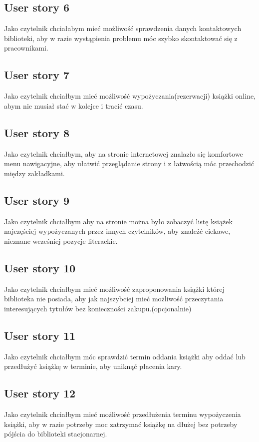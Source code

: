 \documentclass[a4paper]{article}
\begin{document}
\subsection{User story 6}
Jako czytelnik chciałabym mieć możliwość sprawdzenia danych kontaktowych biblioteki, aby w razie wystąpienia problemu móc szybko skontaktować się z pracownikami. 

\subsection{User story 7}
Jako czytelnik chciałbym mieć możliwość wypożyczania(rezerwacji) książki online, abym nie musiał stać w kolejce i tracić czasu. 

\subsection{User story 8}
Jako czytelnik chciałbym, aby na stronie internetowej znalazło się komfortowe menu nawigacyjne, aby ułatwić przeglądanie strony i z łatwością móc przechodzić między zakładkami.

\subsection{User story 9}
Jako czytelnik chciałbym aby na stronie można było zobaczyć listę książek najczęściej wypożyczanych przez innych czytelników, aby znaleźć ciekawe, nieznane wcześniej pozycje literackie. 

\subsection{User story 10}
Jako czytelnik chciałbym mieć możliwość zaproponowania książki której biblioteka nie posiada, aby jak najszybciej mieć możliwość przeczytania interesujących tytułów bez konieczności zakupu.(opcjonalnie)

\subsection{User story 11}
Jako czytelnik chciałbym móc sprawdzić termin oddania książki aby oddać lub przedłużyć książkę w terminie, aby uniknąć płacenia kary.

\subsection{User story 12}
Jako czytelnik chciałbym mieć możliwość przedłużenia terminu wypożyczenia książki, aby w razie potrzeby moc zatrzymać książkę na dłużej bez potrzeby pójścia do biblioteki stacjonarnej.
\end{document}
